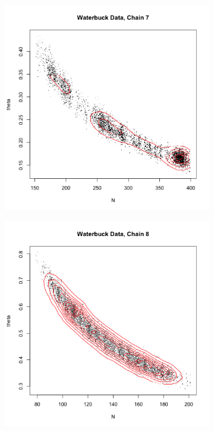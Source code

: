 \documentclass[10pt,psamsfonts]{amsart}
\theoremstyle{definition}
\theoremstyle{remark}
\numberwithin{equation}{section}
\begin{document}
\begin{figure}
\begin{subfigure}[b]{0.3\textwidth}
	\end{subfigure}
	\begin{subfigure}[b]{0.3\textwidth}
		\includegraphics[width=\textwidth]{wonlee_mcmc_waterbuck_7.png}
	\end{subfigure}
	\begin{subfigure}[b]{0.3\textwidth}
		\includegraphics[width=\textwidth]{wonlee_mcmc_waterbuck_8.png}

\end{subfigure}
\end{figure}
\end{document}
